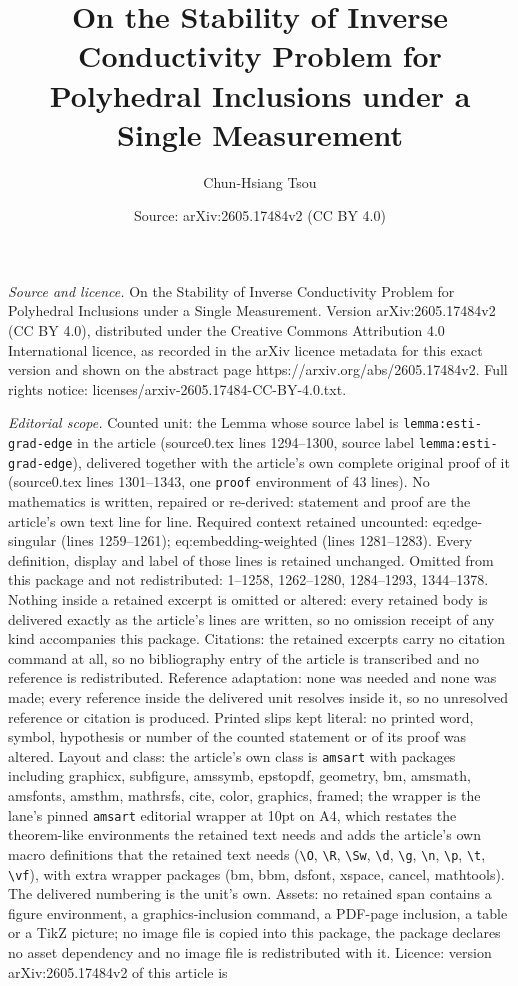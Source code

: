 \documentclass[10pt,a4paper]{amsart}
\title[On the Stability of Inverse Conductivity Problem for Polyhed]{On the Stability of Inverse Conductivity Problem for Polyhedral Inclusions under a Single Measurement}
\author{Chun-Hsiang Tsou}
\date{Source: arXiv:2605.17484v2 (CC BY 4.0)}
\begin{document}
\maketitle

\noindent\emph{Source and licence.} On the Stability of Inverse Conductivity Problem for Polyhedral Inclusions under a Single Measurement. Version arXiv:2605.17484v2 (CC BY 4.0), distributed under the Creative Commons Attribution 4.0 International licence, as recorded in the arXiv licence metadata for this exact version and shown on the abstract page https://arxiv.org/abs/2605.17484v2. Full rights notice: licenses/arxiv-2605.17484-CC-BY-4.0.txt.\par\smallskip

\noindent\textit{Editorial scope.} Counted unit: the Lemma whose source label is \texttt{lemma:esti-grad-edge} in the article (source0.tex lines 1294--1300, source label \texttt{lemma:esti-grad-edge}), delivered together with the article's own complete original proof of it (source0.tex lines 1301--1343, one \texttt{proof} environment of 43 lines). No mathematics is written, repaired or re-derived: statement and proof are the article's own text line for line. Required context retained uncounted: eq:edge-singular (lines 1259--1261); eq:embedding-weighted (lines 1281--1283). Every definition, display and label of those lines is retained unchanged. Omitted from this package and not redistributed: 1--1258, 1262--1280, 1284--1293, 1344--1378. Nothing inside a retained excerpt is omitted or altered: every retained body is delivered exactly as the article's lines are written, so no omission receipt of any kind accompanies this package. Citations: the retained excerpts carry no citation command at all, so no bibliography entry of the article is transcribed and no reference is redistributed. Reference adaptation: none was needed and none was made; every reference inside the delivered unit resolves inside it, so no unresolved reference or citation is produced. Printed slips kept literal: no printed word, symbol, hypothesis or number of the counted statement or of its proof was altered. Layout and class: the article's own class is \texttt{amsart} with packages including graphicx, subfigure, amssymb, epstopdf, geometry, bm, amsmath, amsfonts, amsthm, mathrsfs, cite, color, graphics, framed; the wrapper is the lane's pinned \texttt{amsart} editorial wrapper at 10pt on A4, which restates the theorem-like environments the retained text needs and adds the article's own macro definitions that the retained text needs (\texttt{\textbackslash O}, \texttt{\textbackslash R}, \texttt{\textbackslash Sw}, \texttt{\textbackslash d}, \texttt{\textbackslash g}, \texttt{\textbackslash n}, \texttt{\textbackslash p}, \texttt{\textbackslash t}, \texttt{\textbackslash vf}), with extra wrapper packages (bm, bbm, dsfont, xspace, cancel, mathtools). The delivered numbering is the unit's own. Assets: no retained span contains a figure environment, a graphics-inclusion command, a PDF-page inclusion, a table or a TikZ picture; no image file is copied into this package, the package declares no asset dependency and no image file is redistributed with it. Licence: version arXiv:2605.17484v2 of this article is 
\end{document}
